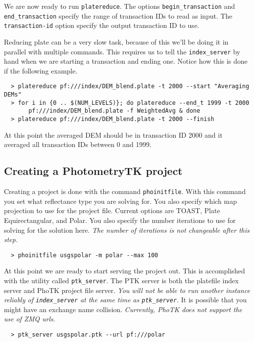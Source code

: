 We are now ready to run \texttt{platereduce}. The options
\texttt{begin\_transaction} and \texttt{end\_transaction} specify the
range of transaction IDs to read as input. The \texttt{transaction-id}
option specify the output transaction ID to use.

Reducing plate can be a very slow task, because of this we'll be doing
it in parallel with multiple commands. This requires us to tell the
\texttt{index\_server} by hand when we are starting a transaction and
ending one. Notice how this is done if the following example.

\begin{verbatim}
  > platereduce pf:///index/DEM_blend.plate -t 2000 --start "Averaging DEMs"
  > for i in {0 .. $(NUM_LEVELS)}; do platereduce --end_t 1999 -t 2000
       pf:///index/DEM_blend.plate -f WeightedAvg & done
  > platereduce pf:///index/DEM_blend.plate -t 2000 --finish
\end{verbatim}

At this point the averaged DEM should be in transaction ID 2000 and it
averaged all transaction IDs between 0 and 1999.

\subsection{Creating a PhotometryTK project}

Creating a project is done with the command \texttt{phoinitfile}. With
this command you set what reflectance type you are solving for. You
also specify which map projection to use for the project file. Current
options are TOAST, Plate Equirectangular, and Polar. You also specify
the number iterations to use for solving for the solution
here. \emph{The number of iterations is not changeable after this
  step.}

\begin{verbatim}
  > phoinitfile usgspolar -m polar --max 100
\end{verbatim}

At this point we are ready to start serving the project out. This is
accomplished with the utility called \texttt{ptk\_server}. The PTK
server is both the platefile index server and PhoTK project file
server. \emph{You will not be able to run another instance reliably of
  \texttt{index\_server} at the same time as \texttt{ptk\_server}.} It
is possible that you might have an exchange name
collision. \emph{Currently, PhoTK does not support the use of ZMQ
  urls.}

\begin{verbatim}
  > ptk_server usgspolar.ptk --url pf:///polar
\end{verbatim}

